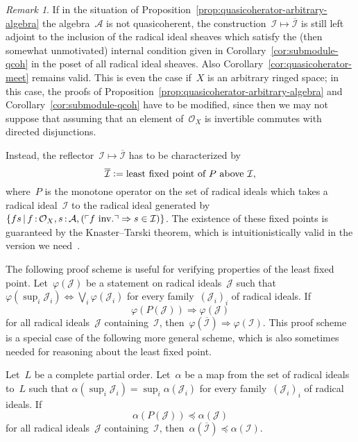 \documentclass[10pt,reqno,a4paper]{amsbook}
\makeatletter
\theoremstyle{definition}
\theoremstyle{plain}
\theoremstyle{remark}
\newtheorem{rem}[defn]{Remark}
\newcommand{\A}{\mathcal{A}}
\renewcommand{\O}{\mathcal{O}}
\newcommand{\I}{\mathcal{I}}
\newcommand{\J}{\mathcal{J}}
\newcommand{\?}{\,{:}\,}
\renewcommand{\_}{\mathpunct{.}\,}
\newcommand{\speak}[1]{\ulcorner\text{\textnormal{#1}}\urcorner}
\newcommand{\inv}{inv.\@}
\newcommand{\defeq}{\vcentcolon=}
\makeatother
\begin{document}
\begin{rem}\label{rem:quasicoherator-knaster-tarski}
If in the situation of
Proposition~\ref{prop:quasicoherator-arbitrary-algebra} the algebra~$\A$ is not
quasicoherent, the construction~$\I \mapsto \overline{\I}$ is still left
adjoint to the inclusion of the radical ideal sheaves which satisfy the (then
somewhat unmotivated) internal condition given in
Corollary~\ref{cor:submodule-qcoh} in the poset of all radical ideal sheaves.
Also Corollary~\ref{cor:quasicoherator-meet} remains valid.
This is even the case if~$X$ is an arbitrary ringed space; in this case,
the proofs of Proposition~\ref{prop:quasicoherator-arbitrary-algebra} and
Corollary~\ref{cor:submodule-qcoh} have to be modified, since then we may not
suppose that assuming that an element of~$\O_X$ is invertible commutes with
directed disjunctions.

Instead, the reflector~$\I \mapsto \overline{\I}$ has to
be characterized by
\[ \overline{\I} \defeq \text{least fixed point of~$P$ above~$\I$}, \]
where~$P$ is the monotone operator on the set of radical ideals which takes a
radical ideal~$\I$ to the radical ideal generated by~$\{ fs \,|\, f\?\O_X,
s\?\A, (\speak{$f$ \inv} \Rightarrow s \in \I) \}$. The existence of these
fixed points is guaranteed by the Knaster--Tarski theorem, which is
intuitionistically valid in the version we need~\cite{bauer:lumsdaine:bourbaki-witt}.

The following proof scheme is useful for verifying properties of the least
fixed point. Let~$\varphi(\J)$ be a statement on radical ideals~$\J$ such that
$\varphi(\sup_i \J_i) \Leftrightarrow \bigvee_i \varphi(\J_i)$ for every
family~$(\J_i)_i$ of radical ideals. If
\[ \varphi(P(\J)) \Longrightarrow \varphi(\J) \]
for all radical ideals~$\J$ containing~$\I$, then~$\varphi(\overline{\I})
\Rightarrow \varphi(\I)$. This proof scheme is a special case of the following
more general scheme, which is also sometimes needed for reasoning about the
least fixed point.

Let~$L$ be a complete partial order. Let~$\alpha$ be a map from the set of
radical ideals to~$L$ such that $\alpha(\sup_i \J_i) = \sup_i \alpha(\J_i)$ for
every family~$(\J_i)_i$ of radical ideals. If
\[ \alpha(P(\J)) \preceq \alpha(\J) \]
for all radical ideals~$\J$ containing~$\I$, then~$\alpha(\overline{\I})
\preceq \alpha(\I)$.
\end{rem}
\end{document}
